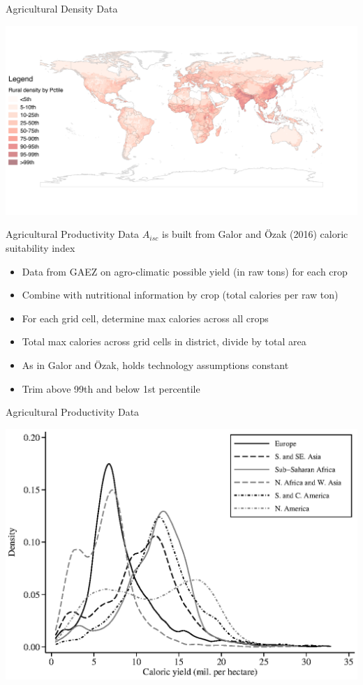 \documentclass[10pt, xcolor=dvipsnames]{beamer}
\begin{document}
\begin{frame}{Agricultural Density Data}
\begin{center}
\includegraphics[scale=.5]{fig_rurd_map.png}
\end{center}
\end{frame}

\begin{frame}{Agricultural Productivity Data}\label{data}
$A_{isc}$ is built from Galor and {\"O}zak (2016) caloric suitability index
\begin{itemize}
  \item Data from GAEZ on agro-climatic possible yield (in raw tons) for each crop
  \item Combine with nutritional information by crop (total calories per raw ton)
  \item For each grid cell, determine max calories across all crops
  \item Total max calories across grid cells in district, divide by total area
  \item As in Galor and {\"O}zak, holds technology assumptions constant
  \item Trim above 99th and below 1st percentile
\end{itemize}
\hfill \hyperlink{stats}{}

\hfill \hyperlink{crops}{}
\end{frame}

\begin{frame}{Agricultural Productivity Data}
\begin{center}
\includegraphics[width=.8\textwidth]{fig_dens_csi.eps}
\end{center}
\end{frame}
\end{document}
